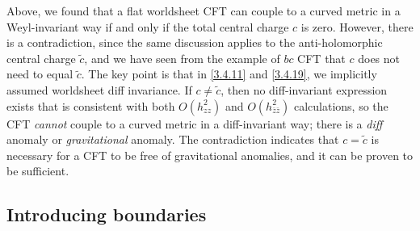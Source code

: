 Above, we found that a flat worldsheet CFT can couple to a curved metric in a Weyl-invariant way if and only if the total central charge $c$ is zero. However, there is a contradiction, since the same discussion applies to the anti-holomorphic central charge $\tilde{c}$, and we have seen from the example of $bc$ CFT that $c$ does not need to equal $\tilde{c}$. The key point is that in \eqref{3.4.11} and \eqref{3.4.19}, we implicitly assumed worldsheet diff invariance.    
If $c\neq \tilde{c}$, then no diff-invariant expression exists that is consistent with both $O(h_{z z}^{2})$ and $O(h_{\bar{z} \bar{z}}^{2})$ calculations, so the CFT \emph{cannot} couple to a curved metric in a diff-invariant way; there is a \emph{diff} anomaly or \emph{gravitational} anomaly.    
The contradiction indicates that $c= \tilde{c}$ is necessary for a CFT to be free of gravitational anomalies, and it can be proven to be sufficient.    

\subsection*{Introducing boundaries}

